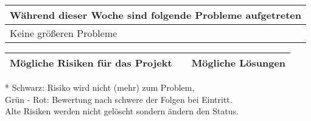 \begin{tabularx}{\textwidth}{X}
    \arrayrulecolor{OliveGreen}
    \toprule
    {\bfseries Während dieser Woche sind folgende Probleme aufgetreten}         \\
    \midrule[2pt]
    Keine größeren Probleme                                                     \\
    \bottomrule[2pt]
\end{tabularx}

\vspace{1cm}

\begin{threeparttable}
    \begin{tabularx}{\textwidth}{XcX}
        \arrayrulecolor{OliveGreen}
        \toprule
        {\bfseries Mögliche Risiken für das Projekt} & {\bfseries *}  & {\bfseries Mögliche Lösungen}  \\ \midrule[2pt]
        \bottomrule[2pt]
    \end{tabularx}

    \begin{tablenotes}\footnotesize
        \item[*] Schwarz: Risiko wird nicht (mehr) zum Problem, \\
                 Grün - Rot: Bewertung nach schwere der Folgen bei Eintritt.\\
                 Alte Risiken werden nicht gelöscht sondern ändern den Status.
    \end{tablenotes}
\end{threeparttable}

